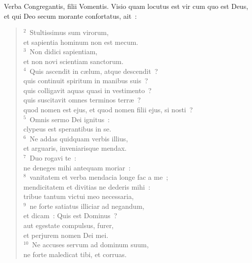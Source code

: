 \bchapter
\lettrine[lines=3,image=true,loversize=0.05,lraise=-0.03]{V}{}erba Congregantis, filii Vomentis. Visio quam locutus est vir cum quo est Deus, et qui Deo secum morante confortatus, ait~:
\begin{flushleft}\begin{verse}\vspace{6pt}${}^{2}$~Stultissimus sum virorum,\\ et sapientia hominum non est mecum.\\
${}^{3}$~Non didici sapientiam,\\ et non novi scientiam sanctorum.\\
${}^{4}$~Quis ascendit in c\ae lum, atque descendit~?\\ quis continuit spiritum in manibus suis~?\\ quis colligavit aquas quasi in vestimento~?\\ quis suscitavit omnes terminos terr\ae~?\\ quod nomen est ejus, et quod nomen filii ejus, si nosti~?\\
${}^{5}$~Omnis sermo Dei ignitus~:\\ clypeus est sperantibus in se.\\
${}^{6}$~Ne addas quidquam verbis illius,\\ et arguaris, inveniarisque mendax.\\
${}^{7}$~Duo rogavi te~:\\ ne deneges mihi antequam moriar~:\\
${}^{8}$~vanitatem et verba mendacia longe fac a me~;\\ mendicitatem et divitias ne dederis mihi~:\\ tribue tantum victui meo necessaria,\\
${}^{9}$~ne forte satiatus illiciar ad negandum,\\ et dicam~: Quis est Dominus~?\\ aut egestate compulsus, furer,\\ et perjurem nomen Dei mei.\\
${}^{10}$~Ne accuses servum ad dominum suum,\\ ne forte maledicat tibi, et corruas.\end{verse}\end{flushleft}


